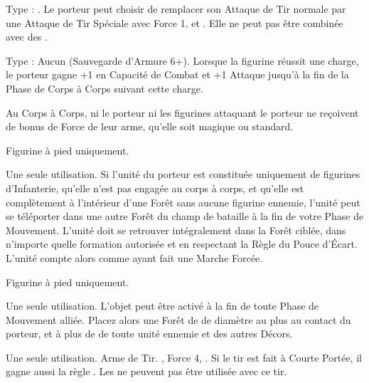 Type : \longbow{}. Le porteur peut choisir de remplacer son Attaque de Tir normale par une Attaque de Tir Spéciale avec Force 1, \poisonedattacks{} et . Elle ne peut pas être combinée avec des \feyarrows{}.

\endpricelist

\armymagicalarmour

\startpricelist

Type : Aucun (Sauvegarde d'Armure 6+). Lorsque la figurine réussit une charge, le porteur gagne +1 en Capacité de Combat et +1 Attaque jusqu'à la fin de la Phase de Corps à Corps suivant cette charge.

\endpricelist

\armytalismans

\startpricelist

Au Corps à Corps, ni le porteur ni les figurines attaquant le porteur ne reçoivent de bonus de Force de leur arme, qu'elle soit magique ou standard.

\endpricelist

\armyenchanteditems

\startpricelist

Figurine à pied uniquement.

Une seule utilisation. Si l'unité du porteur est constituée uniquement de figurines d'Infanterie, qu'elle n'est pas engagée au corps à corps, et qu'elle est complètement à l'intérieur d'une Forêt sans aucune figurine ennemie, l'unité peut se téléporter dans une autre Forêt du champ de bataille à la fin de votre Phase de Mouvement. L'unité doit se retrouver intégralement dans la Forêt ciblée, dans n'importe quelle formation autorisée et en respectant la Règle du Pouce d'Écart. L'unité compte alors comme ayant fait une Marche Forcée.

Figurine à pied uniquement.

Une seule utilisation. L'objet peut être activé à la fin de toute Phase de Mouvement alliée. Placez alors une Forêt de  de diamètre au plus au contact du porteur, et à plus de  de toute unité ennemie et des autres Décors.

Une seule utilisation. Arme de Tir. , Force 4, . Si le tir est fait à Courte Portée, il gagne aussi la règle . Les \feyarrows{} ne peuvent pas être utilisée avec ce tir.

